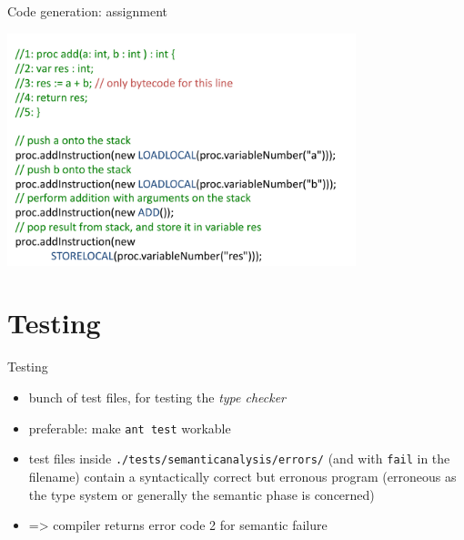 \documentclass{beamer}
\begin{document}
\begin{frame}[label={sec:org34edd90}]{Code generation: assignment}
\begin{center}
 \includegraphics[width=0.76\textwidth]{figures/snaps/codegen-assignment}
\end{center}
\end{frame}
\section{Testing}
\label{sec:org8fb8fce}
\begin{frame}[label={sec:org4bd83c8},fragile]{Testing}
 \begin{itemize}
\item bunch of test files, for testing the \emph{type checker}
\item preferable: make \texttt{ant test} workable

\item test files inside \texttt{./tests/semanticanalysis/errors/} (and with \texttt{fail} in
the filename) contain a syntactically correct but erronous program
(erroneous as the type system or generally the semantic phase is
concerned)

\item => compiler returns error code 2 for semantic failure
\end{itemize}
\end{frame}
\end{document}
